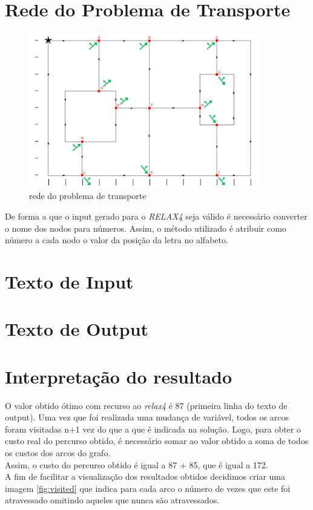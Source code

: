 \documentclass[a4paper]{report}
\begin{document}
\pagebreak
\section{Rede do Problema de Transporte}

\begin{figure}[H]
    \begin{center}
        \includegraphics[width=0.9\textwidth]{images/redeTransporte.png}\par
        \caption{rede do problema de transporte}
        \label{fig:redeTransporte}
    \end{center}
\end{figure}
De forma a que o input gerado para o \textit{RELAX4} seja válido é necessário
converter o nome dos nodos para números. Assim, o método utilizado é atribuir
como número a cada nodo o valor da posição da letra no alfabeto.

\pagebreak
\section{Texto de Input}
\label{input}


\pagebreak
\section{Texto de Output}
\label{output}


\pagebreak
\section{Interpretação do resultado}
\label{solution}
O valor obtido ótimo com recurso ao \textit{relax4} é 87 (primeira linha do
texto de output). Uma vez que foi realizada uma mudança de variável, todos os
arcos foram visitadas n+1 vez do que a que é indicada na solução. Logo, para
obter o custo real do percurso obtido, é necessário somar ao valor obtido a soma
de todos os custos dos arcos do grafo.\\
Assim, o custo do percurso obtido é igual a 87 + 85, que é igual a 172.\\
A fim de facilitar a visualização dos resultados obtidos decidimos criar uma
imagem \ref{fig:visited} que indica para cada arco o número de vezes que este
foi atravessado omitindo aqueles que nunca são atravessados.
\end{document}
